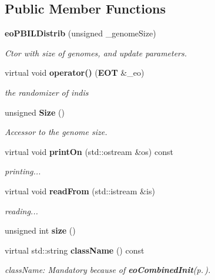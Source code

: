 \subsection*{Public Member Functions}
\begin{CompactItemize}
\item 
{\bf eo\-PBILDistrib} (unsigned \_\-genome\-Size)\label{classeo_p_b_i_l_distrib_a0}

\begin{CompactList}\small\item\em Ctor with size of genomes, and update parameters. \item\end{CompactList}\item 
virtual void {\bf operator()} ({\bf EOT} \&\_\-eo)\label{classeo_p_b_i_l_distrib_a1}

\begin{CompactList}\small\item\em the randomizer of indis \item\end{CompactList}\item 
unsigned {\bf Size} ()\label{classeo_p_b_i_l_distrib_a2}

\begin{CompactList}\small\item\em Accessor to the genome size. \item\end{CompactList}\item 
virtual void {\bf print\-On} (std::ostream \&os) const \label{classeo_p_b_i_l_distrib_a3}

\begin{CompactList}\small\item\em printing... \item\end{CompactList}\item 
virtual void {\bf read\-From} (std::istream \&is)\label{classeo_p_b_i_l_distrib_a4}

\begin{CompactList}\small\item\em reading... \item\end{CompactList}\item 
unsigned int {\bf size} ()\label{classeo_p_b_i_l_distrib_a5}

\item 
virtual std::string {\bf class\-Name} () const 
\begin{CompactList}\small\item\em class\-Name: Mandatory because of {\bf eo\-Combined\-Init}{\rm (p.\,\pageref{classeo_combined_init})}. \item\end{CompactList}\end{CompactItemize}
